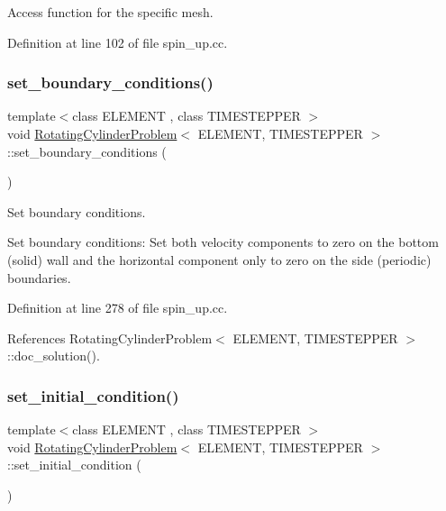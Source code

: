 Access function for the specific mesh. 



Definition at line 102 of file spin\+\_\+up.\+cc.

\mbox{\label{classRotatingCylinderProblem_a37efdb2d7059535a48b12f69869996ee}} 
\subsubsection{\texorpdfstring{set\+\_\+boundary\+\_\+conditions()}{set\_boundary\_conditions()}}
{\footnotesize\ttfamily template$<$class E\+L\+E\+M\+E\+NT , class T\+I\+M\+E\+S\+T\+E\+P\+P\+ER $>$ \\
void \hyperlink{classRotatingCylinderProblem}{Rotating\+Cylinder\+Problem}$<$ E\+L\+E\+M\+E\+NT, T\+I\+M\+E\+S\+T\+E\+P\+P\+ER $>$\+::set\+\_\+boundary\+\_\+conditions (\begin{DoxyParamCaption}{ }\end{DoxyParamCaption})}



Set boundary conditions. 

Set boundary conditions\+: Set both velocity components to zero on the bottom (solid) wall and the horizontal component only to zero on the side (periodic) boundaries. 

Definition at line 278 of file spin\+\_\+up.\+cc.



References Rotating\+Cylinder\+Problem$<$ E\+L\+E\+M\+E\+N\+T, T\+I\+M\+E\+S\+T\+E\+P\+P\+E\+R $>$\+::doc\+\_\+solution().

\mbox{\label{classRotatingCylinderProblem_a5e4316cce2306c4aab4a20b88cdfe6e3}} 
\subsubsection{\texorpdfstring{set\+\_\+initial\+\_\+condition()}{set\_initial\_condition()}}
{\footnotesize\ttfamily template$<$class E\+L\+E\+M\+E\+NT , class T\+I\+M\+E\+S\+T\+E\+P\+P\+ER $>$ \\
void \hyperlink{classRotatingCylinderProblem}{Rotating\+Cylinder\+Problem}$<$ E\+L\+E\+M\+E\+NT, T\+I\+M\+E\+S\+T\+E\+P\+P\+ER $>$\+::set\+\_\+initial\+\_\+condition (\begin{DoxyParamCaption}{ }\end{DoxyParamCaption})}



